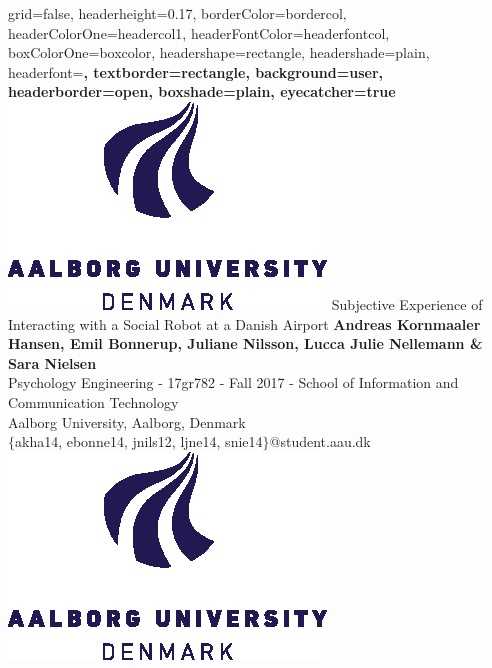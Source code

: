\documentclass[paperwidth=160cm,paperheight=100cm,landscape,fontscale=0.3010]{baposter}
\begin{document}
\graphicspath{{Pictures/}}
\background{ %

}

\begin{poster}{
grid=false,
headerheight=0.17\textheight,
borderColor=bordercol, %
headerColorOne=headercol1, %
headerFontColor=headerfontcol, %
boxColorOne=boxcolor, %
headershape=rectangle, %
headershade=plain,
headerfont=\Large\sf\bf, %
textborder=rectangle,
background=user,
headerborder=open, %
boxshade=plain,
eyecatcher=true
}
%
%
{
\includegraphics[height=0.13\textheight]{aau_logo_new.eps}
} %
{\vspace{2pt}
Subjective Experience of Interacting with a Social Robot at a Danish Airport}
{
\vspace{3pt}
\normalsize{\textbf{Andreas Kornmaaler Hansen, Emil Bonnerup, Juliane Nilsson, Lucca Julie Nellemann \& Sara Nielsen}\\
Psychology Engineering - 17gr782 - Fall 2017 - School of Information and Communication Technology\\ Aalborg University, Aalborg, Denmark\\ }
$\{$akha14, ebonne14, jnils12, ljne14, snie14$\}$@student.aau.dk\\
}
{
\includegraphics[height=0.13\textheight]{aau_logo_new.eps}
}


\end{poster}
\end{document}
